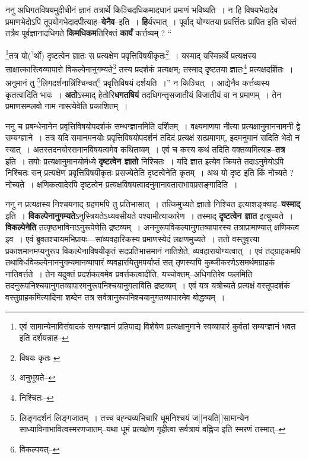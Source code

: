 \documentclass[article,12pt,a4paper]{memoir}
\newcommand{\unclear}[1]{($^{?}$#1)}
\begin{document}
	  \pstart ननु अधिगतविषयमुदीचीनं ज्ञानं तत्रार्थे किञ्चिदधिकमादधानं प्रमाणं भविष्यति । न हि विषयभेदादेव प्रमाणभेदोऽपि तूपयोगभेदादपीत्याह--\textbf{येनैव}--इति । \textbf{हि}र्यरमात् । पूर्वाद् योग्यतया प्रवर्त्तितः प्रापित इति चोक्तं तत्रैव पूर्वज्ञानादधिगते \textbf{किमधिकम}तिरिक्तं \textbf{कार्यं} कर्त्तव्यम् ?  \leavevmode{} “
	  
	\footnote{एवं सामान्येनाविसंवादकं सम्यग्ज्ञानं प्रतिपाद्य विशेषेण प्रत्यक्षानुमाने स्वव्यापारं कुर्वतां सम्यग्ज्ञानं भवत इति दर्शयन्नाह--\cite{dp-msD-n}}\-तत्र यो\unclear{र्थो} दृष्टत्वेन ज्ञातः स प्रत्यक्षेण प्रवृत्तिविषयीकृतः\footnote{विषयः कृतः \cite{dp-msB} \cite{dp-msC} \cite{dp-msD}} । यस्माद् यस्मिन्नर्थे प्रत्यक्षस्य साक्षात्कारित्वव्यापारो विकल्पेनानुगम्यते\footnote{अनुभूयते--\cite{dp-msD-n}} तस्य प्रदर्शकं प्रत्यक्षम्; तस्माद् दृष्टतया ज्ञातः\footnote{निश्चितः--\cite{dp-msD-n}} प्रत्यक्षदर्शितः । अनुमानं तु \footnote{लिङ्गदर्शनं लिङ्गजातम् । तच्च वह्न्यव्यभिचारि धूमनिश्चयं ज[[नयति]]सामान्येन साध्याविनाभावित्वस्मरणजातम्--यथा धूमं प्रत्यक्षेण गृहीत्वा सर्वत्रायं वह्निज इति स्मरणं तस्मात्--\cite{dp-msD-n}}\-लिगदर्शनान्निंश्चिन्वत्\footnote{विकल्पयत्--\cite{dp-msD-n}} प्रवृत्तिविषयं दर्शयति ।” न किञ्चित् । आद्येनैव कर्त्तव्यस्य कृतत्वादिति भावः । \textbf{अतो}ऽस्माद् हेतोरि\textbf{धगतषियं} तदधिगन्तृसजातीयं विजातीयं वा न प्रमाणम् । तेन प्रमाणसम्प्लवो नाम नास्त्येवेति प्रकाशितम् ।
	\pend
      

	  \pstart ननु च प्रबन्धेनानेन प्रवृत्तिविषयोपदर्शकं सम्थग्ज्ञानमिति दर्शितम् । वक्ष्यमाणया नीत्या प्रत्यक्षानुमाननामनी द्वे सम्यग्ज्ञाने । तत्र यदि समानमनयोः प्रवृत्तिविषयोपदर्शनं तदिदं प्रत्यक्षं सत्प्रमाणम्, इदमनुमानं सदिति भेदो न स्यात् । अतस्तदनयोरसमानविषयत्वमेव कथितव्यम् । एवं च कस्य कथं तदिति वक्तव्यमित्याह--\textbf{तत्र} इति । तयोः प्रत्यक्षानुमानयोर्मध्ये \textbf{दृष्टत्वेन ज्ञातो} निश्चितः । यदि ज्ञात इत्येव क्रियते तदाऽनुमेयोऽपि निश्चितः सन् प्रत्यक्षेण प्रवृत्तिविषयीकृतः प्रसज्येतेति दृष्टत्वेनेति कृतम् । अथ यो दृष्ट इति किं नोच्यते ? नोच्यते । क्षणिकत्वादेरपि दृष्टत्वेन प्रत्यक्षविषयत्वादनुमानावताराभावप्रसङ्गादिति ।
	\pend
      

	  \pstart ननु न प्रत्यक्षस्य निश्चयनाद् ग्रहणमपि तु प्रतिभासात् । तत्किमुच्यते ज्ञातो निश्चित इत्याशङ्क्याह--\textbf{यस्माद्} इति । \textbf{विकल्पेनानुगम्यते}ऽनुस्त्रियतेऽध्यवसीयते पश्यामीत्याकारेण । तस्माद् \textbf{दृष्टत्वेन ज्ञात} इत्युच्यते । \textbf{विकल्पेनेति} तत्पृष्ठभाविनाऽनुरूपेणेति द्रष्टव्यम् । अननुरूपविकल्पानुगतव्यापारस्य तत्राप्रामाण्यात् क्षणिकत्व इव । एवं ब्रुवतश्चायमभिप्रायः—सांव्यवहारिकस्य प्रमाणस्येदं लक्ष\leavevmode{}णमुच्यते । ततो वस्तुवृत्त्या प्रकाशमानमप्यनुरूप विकल्पेनाविषयीकृतं सदप्रतिभासमानं नातिशेते, व्यवहारायोग्यत्वात् । एवं तद्ग्राहकमपि तथाविधविकल्पेनाननुगम्यमानव्यापारं व्यवहारयितुमपर्याप्तं सत् तृणस्यापि कुब्जीकरणेऽसमर्थमग्राहकं नातिवर्त्तते । तेन यदुक्तं प्रदर्शकत्वमेव प्रवर्त्तकत्वादीति, यच्चोक्तम्--अधिगतिरेव फलमिति तदनुरूपनिश्चयानुगतव्यापारमनुरूपनिश्चयानुगताविति द्रष्टव्यम् । एवं यत्र यत्रोच्यते प्रत्यक्षं वस्तूपदर्शकं वस्तुग्राहकमित्यादिना शब्देन तत्र सर्वत्रानुरूपनिश्चयानुगतव्यापारमेव बोद्धव्यम् ।
	\pend
      
\end{document}
